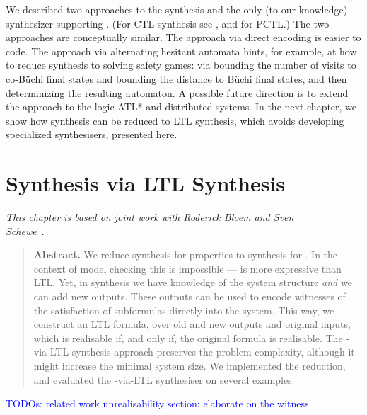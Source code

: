 We described two approaches to the \CTLstar synthesis and
the only (to our knowledge) synthesizer supporting \CTLstar.
(For CTL synthesis see \cite{klenze2016fast,de2012synthesizing,ctlsat},
 and \cite{bounded-pctl} for PCTL.)
The two approaches are conceptually similar.
The approach via direct encoding is easier to code.
The approach via alternating hesitant automata hints,
for example, at how to reduce \CTLstar synthesis to solving safety games:
via
bounding the number of visits to co-B\"uchi final states and
bounding the distance to B\"uchi final states,
and then determinizing the resulting automaton.
A possible future direction is to extend the approach to the logic ATL* and distributed systems.
In the next chapter, we show how \CTLstar synthesis can be reduced to LTL synthesis,
which avoids developing specialized \CTLstar synthesisers,
presented here.


\chapter{\CTLstar Synthesis via LTL Synthesis}\label{chap:ctl-via-ltl}

\hfill {\footnotesize\textit{This chapter is based on joint work with Roderick Bloem and Sven Schewe~\cite{CTLsynt-via-LTLsynt}}.~~~~~~~~}

\begin{quotation}
\noindent\textbf{Abstract.}
We reduce synthesis for \CTLstar properties to synthesis for \LTL.
In the context of model checking this is impossible --- \CTLstar is more expressive than LTL.
Yet, in synthesis we have knowledge of the system structure \emph{and} we can add new outputs.
These outputs can be used to encode witnesses of the satisfaction of \CTLstar subformulas directly into the system.
This way, we construct an LTL formula, over old and new outputs and original inputs,
which is realisable if, and only if, the original \CTLstar formula is realisable.
The \CTLstar-via-LTL synthesis approach preserves the problem complexity,
although it might increase the minimal system size.
We implemented the reduction,
and evaluated the \CTLstar-via-LTL synthesiser on several examples.
\end{quotation}

\iffinal\else
\textcolor{blue}{\small{
TODOs:
\li
\- related work
\- unrealisability section: elaborate on the witness
\il
}
}
\fi


